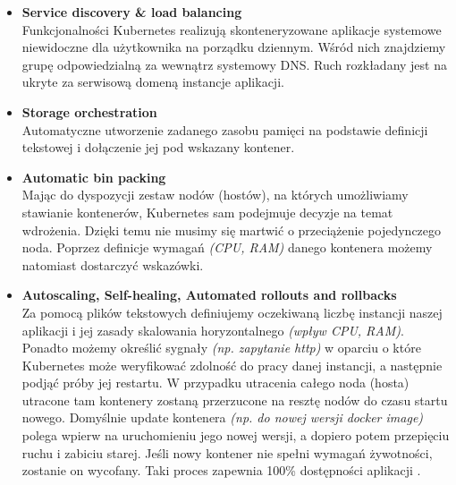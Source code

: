 \begin{itemize}
    \item
    \textbf{Service discovery \& load balancing}\\
    Funkcjonalności Kubernetes realizują skonteneryzowane aplikacje systemowe niewidoczne dla użytkownika na porządku dziennym.
    Wśród nich znajdziemy grupę odpowiedzialną za wewnątrz systemowy DNS. Ruch rozkładany jest na ukryte za serwisową domeną instancje aplikacji. 
    
    \item
    \textbf{Storage orchestration}\\
    Automatyczne utworzenie zadanego zasobu pamięci na podstawie definicji tekstowej i dołączenie jej pod wskazany kontener.

    \item
    \textbf{Automatic bin packing}\\
    Mając do dyspozycji zestaw nodów (hostów), na których umożliwiamy stawianie kontenerów, Kubernetes sam podejmuje decyzje na temat wdrożenia.
    Dzięki temu nie musimy się martwić o przeciążenie pojedynczego noda.
    Poprzez definicje wymagań \emph{(CPU, RAM)} danego kontenera możemy natomiast dostarczyć wskazówki. 

    \item
    \textbf{Autoscaling, Self-healing, Automated rollouts and rollbacks}\\
    Za pomocą plików tekstowych definiujemy oczekiwaną liczbę instancji naszej aplikacji i jej zasady skalowania horyzontalnego \emph{(wpływ CPU, RAM)}.
    Ponadto możemy określić sygnały \emph{(np. zapytanie http)} w oparciu o które Kubernetes może weryfikować zdolność do pracy danej instancji, a następnie podjąć próby jej restartu.
    W przypadku utracenia całego noda (hosta) utracone tam kontenery zostaną przerzucone na resztę nodów do czasu startu nowego.
    Domyślnie update kontenera \emph{(np. do nowej wersji docker image)} polega wpierw na uruchomieniu jego nowej wersji, a dopiero potem przepięciu ruchu i zabiciu starej.
    Jeśli nowy kontener nie spełni wymagań żywotności, zostanie on wycofany. Taki proces zapewnia 100\% dostępności aplikacji \cite{k8s-what}.
\end{itemize} 
